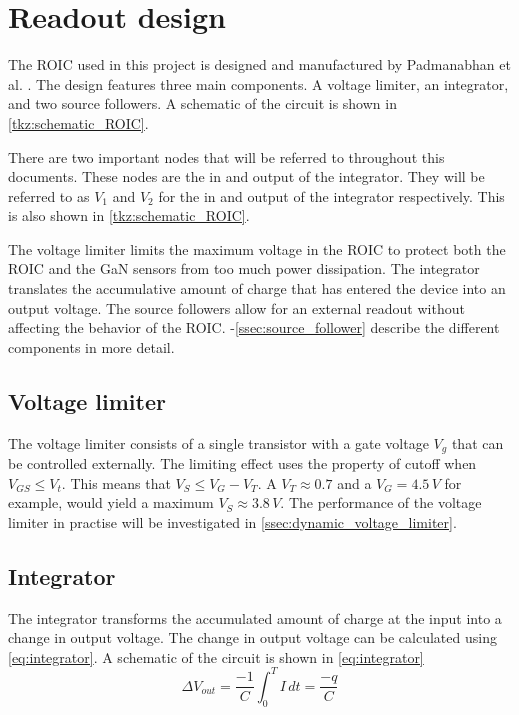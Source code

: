 \section{Readout design}\label{sec:readout_design}
The ROIC used in this project is designed and manufactured by Padmanabhan et al. \cite{preethi}. The design features three main components. A voltage limiter, an integrator, and two source followers. A schematic of the circuit is shown in \cref{tkz:schematic_ROIC}.


There are two important nodes that will be referred to throughout this documents. These nodes are the in and output of the integrator. They will be referred to as $V_1$ and $V_2$ for the in and output of the integrator respectively. This is also shown in \cref{tkz:schematic_ROIC}.

The voltage limiter limits the maximum voltage in the ROIC to protect both the ROIC and the GaN sensors from too much power dissipation. The integrator translates the accumulative amount of charge that has entered the device into an output voltage. The source followers allow for an external readout without affecting the behavior of the ROIC. -\ref{ssec:source_follower} describe the different components in more detail.



\subsection{Voltage limiter}\label{ssec:voltage_limiter}
The voltage limiter consists of a single transistor with a gate voltage $V_g$ that can be controlled externally. The limiting effect uses the property of cutoff when $V_{GS}\leq V_t$. This means that $V_S\leq V_G - V_T$. A $V_T\approx0.7$ and a $V_G=4.5\,V$ for example, would yield a maximum $V_S\approx 3.8\,V$. The performance of the voltage limiter in practise will be investigated in \cref{ssec:dynamic_voltage_limiter}.

\subsection{Integrator}\label{ssec:integrator}
The integrator transforms the accumulated amount of charge at the input into a change in output voltage. The change in output voltage can be calculated using \cref{eq:integrator}. A schematic of the circuit is shown in \cref{eq:integrator}
\begin{equation}
    \Delta V_{out} = \frac{-1}{C}\int_{0}^{T}I\,dt = \frac{-q}{C} 
    \label{eq:integrator}
\end{equation}

